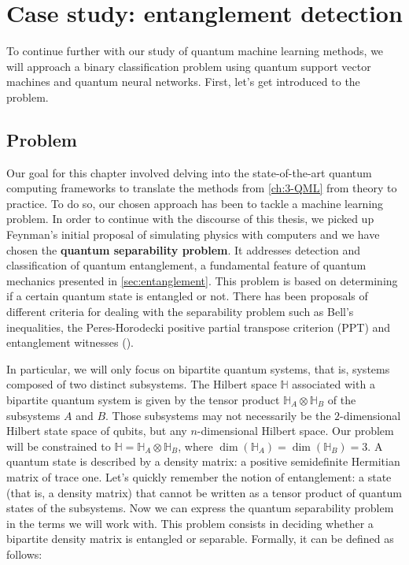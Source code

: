 
\chapter{Case study: entanglement detection}\label{ch:4-Implementation}



To continue further with our study of quantum machine learning methods, we will approach a binary classification problem using quantum support vector machines and quantum neural networks. First, let's get introduced to the problem.

\section{Problem}
Our goal for this chapter involved delving into the state-of-the-art quantum computing frameworks to translate the methods from \autoref{ch:3-QML} from theory to practice. To do so, our chosen approach has been to tackle a machine learning problem. In order to continue with the discourse of this thesis, we picked up Feynman's initial proposal of simulating physics with computers and we have chosen the \textbf{quantum separability problem}. It addresses detection and classification of quantum entanglement, a fundamental feature of quantum mechanics presented in \autoref{sec:entanglement}. This problem is based on determining if a certain quantum state is entangled or not. There has been proposals of different criteria for dealing with the separability problem such as Bell's inequalities, the Peres-Horodecki positive partial transpose criterion (PPT) and entanglement witnesses (\cite{HORODECKI19961, guhne2009entanglement}). 

In particular, we will only focus on bipartite quantum systems, that is, systems composed of two distinct subsystems. The Hilbert space $\mathbb{H}$ associated with a bipartite quantum system is given by the tensor product $\mathbb{H}_A \otimes \mathbb{H}_B$ of the subsystems $A$ and $B$. Those subsystems may not necessarily be the $2$-dimensional Hilbert state space of qubits, but any $n$-dimensional Hilbert space. Our problem will be constrained to $\mathbb{H}=\mathbb{H}_A \otimes \mathbb{H}_B$, where $\dim (\mathbb{H}_A )= \dim (\mathbb{H}_B ) = 3 $. A quantum state is described by a density matrix: a positive semidefinite Hermitian matrix of trace one. Let's quickly remember the notion of entanglement: a state (that is, a density matrix) that cannot be written as a tensor product of quantum states of the subsystems. Now we can express the quantum separability problem in the terms we will work with. This problem consists in deciding whether a bipartite density matrix is entangled or separable. Formally, it can be defined as follows:

